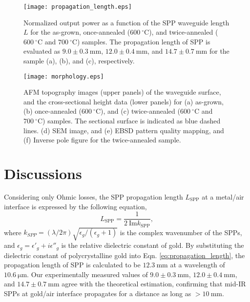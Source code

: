 \documentclass[aip,apl,reprint]{revtex4-1}
\begin{document}
 \begin{figure}
    \texttt{[image: propagation\_length.eps]}
    \caption{Normalized output power as a function of the SPP waveguide length $L$ for the as-grown, once-annealed ($600\:^\circ\mathrm{C}$), and twice-annealed ($600\:^\circ\mathrm{C}$ and $700\:^\circ\mathrm{C}$) samples. The propagation length of SPP is evaluated as $9.0\pm0.3\:\mathrm{mm}$, $12.0\pm0.4\:\mathrm{mm}$, and $14.7\pm0.7\:\mathrm{mm}$ for the sample (a), (b), and (c), respectively.}
       \label{fig:propagation_length}
\end{figure}

 \begin{figure}
    \texttt{[image: morphology.eps]}
        \caption{AFM topography images (upper panels) of the waveguide surface, and the cross-sectional height data (lower panels) for (a) as-grown, (b) once-annealed ($600\:^\circ\mathrm{C}$), and (c) twice-annealed ($600\:^\circ\mathrm{C}$ and $700\:^\circ\mathrm{C}$) samples. The sectional surface is indicated as blue dashed lines. (d) SEM image, and (e) EBSD pattern quality mapping, and (f) Inverse pole figure for the twice-annealed sample.}
    \label{fig:morphology}
\end{figure}

\section{Discussions}
\label{sec:discussion}
Considering only Ohmic losses, the SPP propagation length $L_{\mathrm{SPP}}$ at a metal/air interface is expressed by the following equation,
\begin{equation}
 L_{\mathrm{SPP}} = \frac{1}{2\:\mathrm{Im} k_{\mathrm{SPP}}},
\label{eq:propagation_length}
 \end{equation}
where $k_{SPP}=(\lambda/2\pi)\sqrt{\epsilon_g/(\epsilon_g+1)}$ is the complex wavenumber of the SPPs, and $\epsilon_g=\epsilon'_g+i\epsilon''_g$ is the relative dielectric constant of gold. 
By substituting the dielectric constant of polycrystalline gold\cite{Palik} into Eqn. \ref{eq:propagation_length}, the propagation length of SPP is calculated to be $12.3\:\mathrm{mm}$ at a wavelength of $10.6\:\mathrm{\mu m}$.
Our experimentally measured values of  $9.0\pm0.3\:\mathrm{mm}$, $12.0\pm0.4\:\mathrm{mm}$, and $14.7\pm0.7\:\mathrm{mm}$ agree with the theoretical estimation, confirming that mid-IR SPPs at gold/air interface propagates for a distance as long as $>10\:\mathrm{mm}$.
\end{document}
